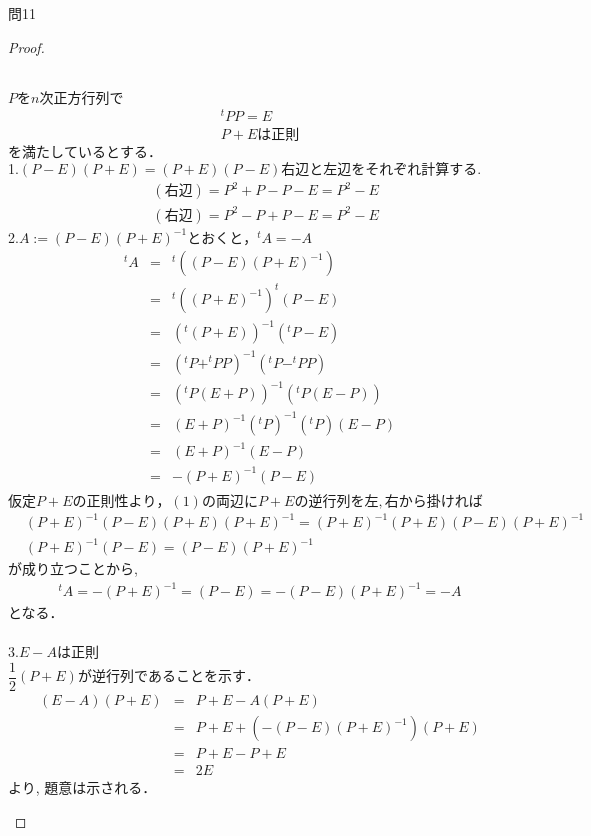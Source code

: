 \documentclass[dvipdfmx,uplatex,11pt]{jsarticle}
\theoremstyle{definition}
\begin{document}
\newpage

問11\\
\noindent
\begin{proof}
\begin{leftbar}
~\\
$Pをn次正方行列で$
\begin{eqnarray*}
^t PP=E\\
P+Eは正則
\end{eqnarray*}
$を満たしているとする．$\\
1.$(P − E)(P + E) = (P + E)(P − E)右辺と左辺をそれぞれ計算する.$
\begin{eqnarray*}
& (右辺) = P^2+P−P−E=P^2−E\\
& (右辺) = P^2−P+P−E=P^2−E
\end{eqnarray*}
2.$A := (P − E)(P + E)^{−1}とおくと，^tA=−A$
\begin{eqnarray*}
^tA&=&^t((P−E)(P+E)^{−1})\\
&=&^t((P+E)^{-1})^t(P−E)\\
&=&(^t(P+E))^{-1}(^tP−E)\\
&=&(^tP+^tPP)^{-1}(^tP−^tPP)\\
&=&(^tP(E + P))^{-1}(^tP(E − P))\\
&=&(E + P)^{−1}(^tP)^{−1}(^tP)(E − P)\\
&=&(E + P)^{−1}(E − P)\\
&=&−(P + E)^{−1}(P − E)\\
\end{eqnarray*}
$仮定P+Eの正則性より，(1)の両辺にP+Eの逆行列を左, 右から掛ければ$
\begin{eqnarray*}
& (P + E)^{-1}(P − E)(P + E)(P + E)^{−1}=(P + E)^{−1}(P + E)(P − E)(P + E)^{−1}\\
& (P + E)^{−1}(P − E)=(P − E)(P + E)^{−1}
\end{eqnarray*}
が成り立つことから,
\begin{eqnarray*}
^tA = −(P + E)^{−1}=(P − E) = −(P − E)(P + E)^{−1}= −A
\end{eqnarray*}
となる．\\
\\
3.$E − A は正則$\\
$\dfrac{1}{2}(P + E) が逆行列であることを示す．$
\begin{eqnarray*}
(E−A)(P+E)&=&P+E−A(P+E)\\
&=&P+E+(−(P − E)(P + E)^{−1})(P + E)\\
&=&P+E−P+E \\
&=&2E
\end{eqnarray*}
より, 題意は示される．
\end{leftbar}

\end{proof}
\end{document}

